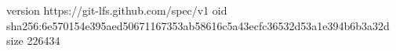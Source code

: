 version https://git-lfs.github.com/spec/v1
oid sha256:6e570154e395aed50671167353ab58616c5a43ecfc36532d53a1e394b6b3a32d
size 226434
